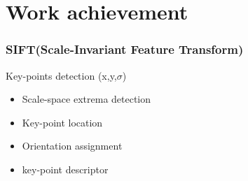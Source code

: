 \documentclass[xcolor=table]{beamer}
\begin{document}
\section{Work achievement}
\begin{frame} \frametitle{SIFT(Scale-Invariant Feature Transform)}

Key-points detection (x,y,$\sigma$)
\begin{itemize}

\item Scale-space extrema detection\\


 \item  Key-point location\\


\item Orientation assignment\\


\item key-point descriptor 
\\

\end{itemize}
\end{frame}
\end{document}
